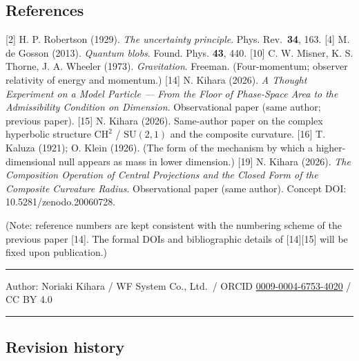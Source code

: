 \documentclass[
]{article}
\begin{document}
\subsection{References}\label{references}

{[}2{]} H. P. Robertson (1929). \emph{The uncertainty principle}. Phys.
Rev.~\textbf{34}, 163. {[}4{]} M. de Gosson (2013). \emph{Quantum
blobs}. Found. Phys. \textbf{43}, 440. {[}10{]} C. W. Misner, K. S.
Thorne, J. A. Wheeler (1973). \emph{Gravitation}. Freeman.
(Four-momentum; observer relativity of energy and momentum.) {[}14{]} N.
Kihara (2026). \emph{A Thought Experiment on a Model Particle --- From
the Floor of Phase-Space Area to the Admissibility Condition on
Dimension}. Observational paper (same author; previous paper). {[}15{]}
N. Kihara (2026). Same-author paper on the complex hyperbolic structure
\(\mathrm{CH}^2\) / \(\mathrm{SU}(2,1)\) and the composite curvature.
{[}16{]} T. Kaluza (1921); O. Klein (1926). (The form of the mechanism
by which a higher-dimensional null appears as mass in lower dimension.)
{[}19{]} N. Kihara (2026). \emph{The Composition Operation of Central
Projections and the Closed Form of the Composite Curvature Radius}.
Observational paper (same author). Concept DOI: 10.5281/zenodo.20060728.

(Note: reference numbers are kept consistent with the numbering scheme
of the previous paper {[}14{]}. The formal DOIs and bibliographic
details of {[}14{]}{[}15{]} will be fixed upon publication.)

\begin{center}\rule{0.5\linewidth}{0.5pt}\end{center}

Author: Noriaki Kihara / WF System Co., Ltd.~/ ORCID
\href{https://orcid.org/0009-0004-6753-4020}{0009-0004-6753-4020} / CC
BY 4.0

\begin{center}\rule{0.5\linewidth}{0.5pt}\end{center}

\subsection{Revision history}\label{revision-history}
\end{document}
